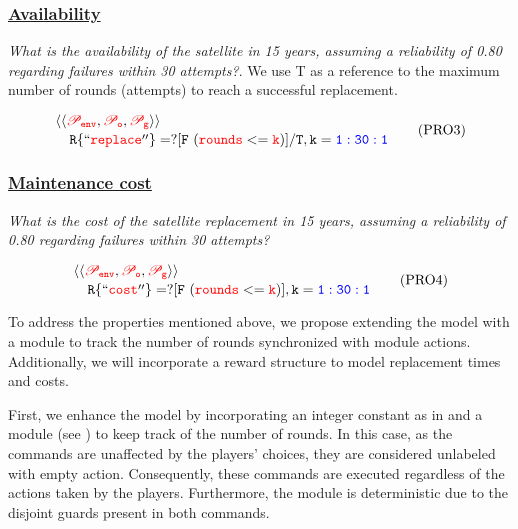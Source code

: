 \subsubsection{\underline{Availability}} \emph{What is the availability of the satellite in 15 years, assuming a reliability of 0.80 regarding failures within 30 attempts?}. We use T as a reference to the maximum number of rounds (attempts) to reach a successful replacement.

    \begin{resp}{ }
             \begin{equation}
             \splitdfrac{\mathtt{  \langle\langle\textcolor{red}{\mathcal{P}_{env}}, \textcolor{red}{\mathcal{P}_{o}}, \textcolor{red}{\mathcal{P}_{g}}} \rangle\rangle}{ \\ \mathtt{ R\{\quot{\textcolor{red}{replace}} \}=? [ F \  (\textcolor{red}{rounds}<=\textcolor{red}{k}) ]/T ,k=\textcolor{blue}{1:30:1}}} 
        \label{eq3}
        \tag{PRO3}
    \end{equation}
        \end{resp}
        \normalsize

\subsubsection{\underline{Maintenance cost}} \emph{What is the cost of the satellite replacement in 15 years, assuming a reliability of 0.80 regarding failures within 30 attempts?} 

    \begin{resp}{ }
             \begin{equation}
             \splitdfrac{\mathtt{  \langle\langle\textcolor{red}{\mathcal{P}_{env}}, \textcolor{red}{\mathcal{P}_{o}}, \textcolor{red}{\mathcal{P}_{g}}} \rangle\rangle}{ \\ \mathtt{ R\{\quot{\textcolor{red}{cost}} \}=? [ F \  (\textcolor{red}{rounds}<=\textcolor{red}{k}) ] ,k=\textcolor{blue}{1:30:1}}} 
        \label{eq4}
        \tag{PRO4}
    \end{equation}
        \end{resp}
        \normalsize

To address the properties mentioned above, we propose extending the model with a module to track the number of rounds synchronized with module actions. Additionally, we will incorporate a reward structure to model replacement times and costs.
        
First, we enhance the model by incorporating an integer constant as in \cite{KNPS19} and a module (see ) to keep track of the number of rounds. In this case, as the commands are unaffected by the players' choices, they are considered unlabeled with empty action. Consequently, these commands are executed regardless of the actions taken by the players. Furthermore, the module is deterministic due to the disjoint guards present in both commands. 

